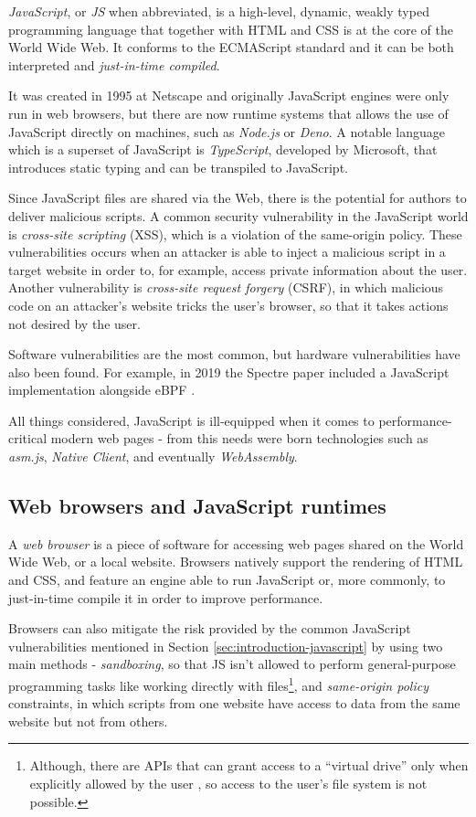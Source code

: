 \textit{JavaScript}, or \textit{JS} when abbreviated, is a high-level, dynamic, weakly typed programming language
that together with HTML and CSS is at the core of the World Wide Web. It conforms to the ECMAScript standard \cite{ecma-262}
and it can be both interpreted and \textit{just-in-time compiled}.

It was created in 1995 at Netscape and originally JavaScript engines were only run in web browsers, but there
are now runtime systems that allows the use of JavaScript directly on machines, such as \textit{Node.js} or \textit{Deno}.
A notable language which is a superset of JavaScript is \textit{TypeScript}, developed by Microsoft, that
introduces static typing and can be transpiled to JavaScript.

Since JavaScript files are shared via the Web, there is the potential for authors to deliver
malicious scripts.
A common security vulnerability in the JavaScript world is \textit{cross-site scripting} (XSS), which is a violation of the
same-origin policy. These vulnerabilities occurs when an attacker is able to inject a malicious script in a target website
in order to, for example, access private information about the user.
Another vulnerability is \textit{cross-site request forgery} (CSRF), in which malicious code on an attacker's website
tricks the user's browser, so that it takes actions not desired by the user.

Software vulnerabilities are the most common, but hardware vulnerabilities have also been found.
For example, in 2019 the Spectre paper included a JavaScript implementation alongside eBPF \cite{spectre}.

All things considered, JavaScript is ill-equipped when it comes to performance-critical modern web
pages - from this needs were born technologies such as \textit{asm.js}, \textit{Native Client}, and eventually \textit{WebAssembly}.

\subsection{Web browsers and JavaScript runtimes}

A \textit{web browser} is a piece of software for accessing web pages shared on the World Wide Web, or a
local website. Browsers natively support the rendering of HTML and CSS, and feature an engine able to run JavaScript or, more commonly,
to just-in-time compile it in order to improve performance.

Browsers can also mitigate the risk provided by the common JavaScript vulnerabilities mentioned in Section \ref{sec:introduction-javascript}
by using two main methods - \textit{sandboxing}, so that JS isn't allowed to perform general-purpose
programming tasks like working directly with files\footnote{Although, there are APIs that can grant access to a ``virtual drive''
only when explicitly allowed by the user \cite{filesystem-mdn}, so access to the user's file system is not possible.},
and \textit{same-origin policy} constraints, in which scripts from one website have access to data from the same website but not from others.

